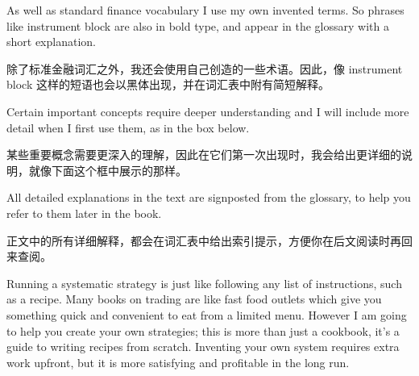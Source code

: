 \begin{englishblock} As well as standard finance vocabulary I use my own invented terms. So phrases like instrument block are also in bold type, and appear in the glossary with a short explanation. \end{englishblock}

\begin{chineseblock}除了标准金融词汇之外，我还会使用自己创造的一些术语。因此，像 instrument block 这样的短语也会以黑体出现，并在词汇表中附有简短解释。\end{chineseblock}

\bipairgap

\begin{englishblock} Certain important concepts require deeper understanding and I will include more detail when I first use them, as in the box below. \end{englishblock}

\begin{chineseblock}某些重要概念需要更深入的理解，因此在它们第一次出现时，我会给出更详细的说明，就像下面这个框中展示的那样。\end{chineseblock}

\bipairgap

\begin{englishblock} All detailed explanations in the text are signposted from the glossary, to help you refer to them later in the book. \end{englishblock}

\begin{chineseblock}正文中的所有详细解释，都会在词汇表中给出索引提示，方便你在后文阅读时再回来查阅。\end{chineseblock}



\begin{englishblock} Running a systematic strategy is just like following any list of instructions, such as a recipe. Many books on trading are like fast food outlets which give you something quick and convenient to eat from a limited menu. However I am going to help you create your own strategies; this is more than just a cookbook, it's a guide to writing recipes from scratch. Inventing your own system requires extra work upfront, but it is more satisfying and profitable in the long run. \end{englishblock}

